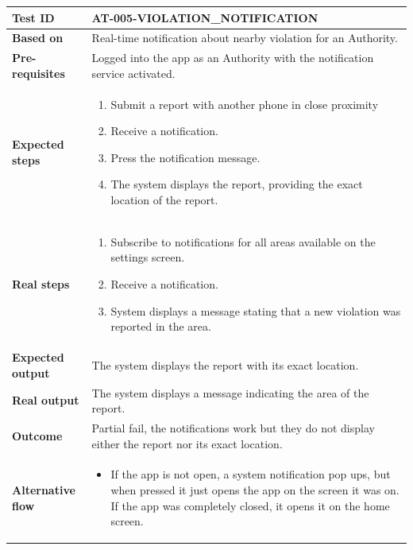 \begin{table}[H]
    \centering
    \begin{tabular}{p{3cm}p{10cm}}
    \textbf{Test ID} & AT-005-VIOLATION\_NOTIFICATION \\ \hline
    \textbf{Based on} & Real-time notiﬁcation about nearby violation for an Authority. \\ \hline
    \textbf{Pre-requisites} & Logged into the app as an Authority with the notification service activated. \\ \hline
    \textbf{Expected steps} & 
        \begin{enumerate} \itemsep0em
            \item Submit a report with another phone in close proximity
            \item Receive a notification.
            \item Press the notification message.
            \item The system displays the report, providing the exact location of the report.
        \end{enumerate} \\ \hline
    \textbf{Real steps} & 
        \begin{enumerate} \itemsep0em
            \item Subscribe to notifications for all areas available on the settings screen.
            \item Receive a notification.
            \item System displays a message stating that a new violation was reported in the area.
        \end{enumerate} \\ \hline
    \textbf{Expected output} & The system displays the report with its exact location. \\ \hline
    \textbf{Real output} & The system displays a message indicating the area of the report. \\ \hline
    \textbf{Outcome} & Partial fail, the notifications work but they do not display either the report nor its exact location. \\ \hline
    \textbf{Alternative flow} & 
        \begin{itemize} \itemsep0em
            \item If the app is not open, a system notification pop ups, but when pressed it just opens the app on the screen it was on. If the app was completely closed, it opens it on the home screen.
        \end{itemize} \\ \hline
    \end{tabular}
\end{table}


